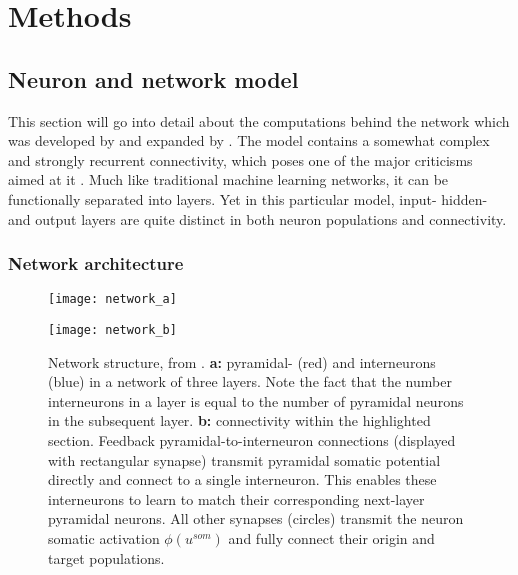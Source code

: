 
\chapter{Methods}




\section{Neuron and network model}

This section will go into detail about the computations behind the network which was developed by
\cite{sacramento2018dendritic} and expanded by \cite{Haider2021}. The model contains a somewhat complex and strongly
recurrent connectivity, which poses one of the major criticisms aimed at it \citep{whittington2019theories}. Much like
traditional machine learning networks, it can be functionally separated into layers. Yet in this particular model,
input- hidden- and output layers are quite distinct in both neuron populations and connectivity.


\subsection{Network architecture}

\begin{figure}[t]
  \centering
  \begin{minipage}{0.5\textwidth}
    \centering
    \texttt{[image: network\_a]}
  \end{minipage}\hfill
  \begin{minipage}{0.4\textwidth}
    \centering
    \texttt{[image: network\_b]}
  \end{minipage}
  \caption{Network structure, from \cite{Haider2021}. \textbf{a:} pyramidal- (red) and interneurons (blue) in a network
    of three layers. Note the fact that the number interneurons in a layer is equal to the number of pyramidal neurons
    in the subsequent layer\protect\footnotemark. \textbf{b:} connectivity within the highlighted section. Feedback
    pyramidal-to-interneuron connections (displayed with rectangular synapse) transmit pyramidal somatic potential
    directly and connect to a single interneuron. This enables these interneurons to learn to match their corresponding
    next-layer pyramidal neurons. All other synapses (circles) transmit the neuron somatic activation $\phi (u^{som})$
    and fully connect their origin and target populations.}
  \label{fig-network}
\end{figure}

